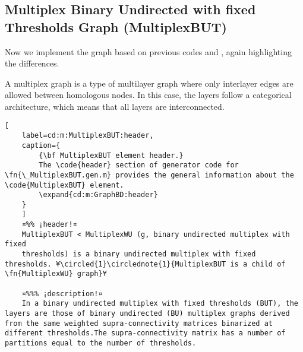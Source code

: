\documentclass{tufte-handout}
\begin{document}
\clearpage

\subsection{Multiplex Binary Undirected with fixed Thresholds Graph (MultiplexBUT)}

Now we implement the  graph based on previous codes  and , again highlighting the differences.

A multiplex graph is a type of multilayer graph where only interlayer edges are allowed between homologous nodes. In this case, the layers follow a categorical architecture, which means that all layers are interconnected.


\begin{lstlisting}[
	label=cd:m:MultiplexBUT:header,
	caption={
		{\bf MultiplexBUT element header.}
		The \code{header} section of generator code for \fn{\_MultiplexBUT.gen.m} provides the general information about the \code{MultiplexBUT} element.
		\expand{cd:m:GraphBD:header}
	}
	]
	¤%% ¡header!¤
	MultiplexBUT < MultiplexWU (g, binary undirected multiplex with fixed
	thresholds) is a binary undirected multiplex with fixed thresholds. ¥\circled{1}\circlednote{1}{MultiplexBUT is a child of \fn{MultiplexWU} graph}¥
	
	¤%%% ¡description!¤
	In a binary undirected multiplex with fixed thresholds (BUT), the layers are those of binary undirected (BU) multiplex graphs derived from the same weighted supra-connectivity matrices binarized at different thresholds.The supra-connectivity matrix has a number of partitions equal to the number of thresholds.

\end{lstlisting}
\end{document}
